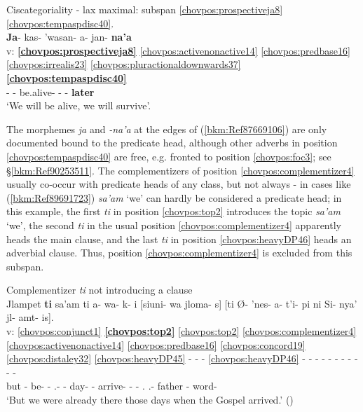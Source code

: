 \documentclass[output=paper]{langscibook}
\begin{document}
\ea\label{bkm:Ref87669106} Ciscategoriality - lax maximal: subspan \ref{chovpos:prospectiveja8}\ref{chovpos:tempaspdisc40}. \\
\glll {} \textbf{Ja}- kas- 'wasan- a- jan{}- \textbf{na'a} \\ 
    v: \textbf{\ref{chovpos:prospectiveja8}} \ref{chovpos:activenonactive14} \ref{chovpos:predbase16} \ref{chovpos:irrealis23} \ref{chovpos:pluractionaldownwards37} \textbf{\ref{chovpos:tempaspdisc40}} \\ 
    {} \textbf{\Prosp{}}- \First\Pl{}- be.alive- \Irr{}- \Jen{}- \textbf{later} \\
\glt `We will be alive, we will survive'.
\z 

The morphemes \textit{ja} and \textit{-na'a} at the edges of (\ref{bkm:Ref87669106}) are only documented bound to the predicate head, although other adverbs in position \ref{chovpos:tempaspdisc40} are free, e.g. fronted to position \ref{chovpos:foc3}; see §\ref{bkm:Ref90253511}. The complementizers of position \ref{chovpos:complementizer4} usually co-occur with predicate heads of any class, but not always - in cases like (\ref{bkm:Ref89691723}) \textit{sa'am} `we' can hardly be considered a predicate head; in this example, the first \textit{ti} in position \ref{chovpos:top2} introduces the topic \textit{sa'am} `we', the second \textit{ti} in the usual position \ref{chovpos:complementizer4} apparently heads the main clause, and the last \textit{ti} in position \ref{chovpos:heavyDP46} heads an adverbial clause. Thus, position \ref{chovpos:complementizer4} is excluded from this subspan.


\ea\label{bkm:Ref90321059} \label{bkm:Ref89691723} Complementizer \textit{ti} not introducing a clause \\
\glll {} Jlampet \textbf{ti} sa'am ti a- wa- k- i [siuni- wa jloma- s] [ti Ø- 'nes- a- t'i- pi ni Si- nya' jl- amt- is].\\
v: \ref{chovpos:conjunct1} \textbf{\ref{chovpos:top2}} \ref{chovpos:top2} \ref{chovpos:complementizer4} \ref{chovpos:activenonactive14} \ref{chovpos:predbase16} \ref{chovpos:concord19} \ref{chovpos:distaley32} \ref{chovpos:heavyDP45} - - - \ref{chovpos:heavyDP46} - - - - - - - - - - -\\
{} but \textbf{\Comp{}} \First\Pl{} \Comp{} \First{}- be- \First\Pl{}- \Ap.\Dist{}-  \Dem{}- \Pl{} day- \Pl{} \Comp{} \Third{}- arrive- \Mom{}- \Evid{}- \Rem.\Pst{} \First\Pl.\Poss{}- father \Third\Poss{}- word- \Pl{}\\
\glt `But we were already there those days when the Gospel arrived.' (\citealt[106]{DraysonGomez2000})
\z 
\end{document}
